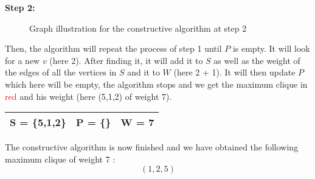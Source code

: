     \vspace{1\baselineskip}

    \begin{minipage}{\linewidth}
        \textbf{Step 2:} \newline
        \begin{minipage}{0.4\textwidth}
            \begin{figure}[H]
                \centering
                \caption{Graph illustration for the constructive algorithm at step 2}
                \label{fig:constructive-mewc-edge}
            \end{figure}
        \end{minipage}
        \begin{minipage}{0.6\textwidth}
            Then, the algorithm will repeat the process of step 1 until $P$ is empty. It will look for a new $v$ (here 2). After finding it, it will add it to $S$ as well as the weight of the edges of all the vertices in $S$ and it to $W$ (here 2 + 1). It will then update $P$ which here will be empty, the algorithm stops and we get the maximum clique in \textcolor{red}{red} and his weight (here (5,1,2) of weight 7).
    
            \begin{center}
                \begin{tabular}{|lll|}
                    \hline
                    S = \{5,1,2\} & P = \{\} & W = 7 \\
                    \hline
                \end{tabular}
            \end{center}
        \end{minipage}
    \end{minipage}

    \vspace{1\baselineskip}

    The constructive algorithm is now finished and we have obtained the following maximum clique of weight 7 : $$(1,2,5)$$

\newpage

